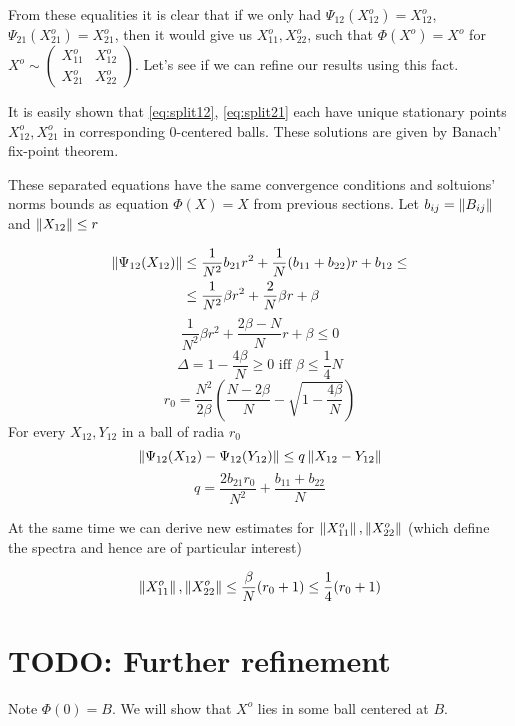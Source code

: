 \documentclass{article}
\begin{document}
From these equalities it is clear that if we only had
\( {\Psi_{12}(X_{12}^o) = X_{12}^o} \),
\( {\Psi_{21}(X_{21}^o) = X_{21}^o} \),
then it would give us \( X_{11}^o, X_{22}^o \), such that
\( \Phi(X^o) = X^o \) for
\( X^o \sim
\left(\begin{smallmatrix}
    X_{11}^o & X_{12}^o \\
    X_{21}^o & X_{22}^o
\end{smallmatrix}\right) \).
Let's see if we can refine our results using this fact.

It is easily shown
that \eqref{eq:split12}, \eqref{eq:split21}
each have unique stationary points \( X_{12}^o, X_{21}^o \)
in corresponding \( 0 \)-centered balls.
These solutions are given by Banach' fix-point theorem.

These separated equations have the same convergence conditions
and soltuions' norms bounds as equation \( \Phi(X)=X \) from previous sections.
Let \( b_{ij} = \left\|{B_{ij}}\right\| \)
and \( \left\|{X_{12}}\right\| \leq r \)

\[\begin{aligned}
    \left\|{\Psi_{12}(X_{12})}\right\|
    & \leq \frac1{N^2} b_{21}r^2 + \frac1N (b_{11}+b_{22}) r + b_{12} \leq \\
    & \leq \frac{1}{N^2}\beta r^2 + \frac2N \beta r + \beta
\end{aligned}\]
\[ \frac{1}{N^2}\beta r^2 + \frac{2\beta - N}{N} r + \beta \leq 0 \]
\[
    \Delta = 1 - \frac{4\beta}{N} \geq 0
    \text{ iff }
    \beta \leq \frac14 N
\]
\[
    r_0 = \frac{N^2}{2\beta}
          \left(
                \frac{N-2\beta}{N} - \sqrt{1 - \frac{4\beta}{N}}
          \right)
    \]
For every \( X_{12}, Y_{12} \) in a ball of radia \( r_0 \)
\[ \left\|{\Psi_{12}(X_{12}) - \Psi_{12}(Y_{12})}\right\| \leq q \left\|{X_{12}-Y_{12}}\right\| \]
\begin{equation}\label{eq:convergencespeed}
    q = \frac{2 b_{21} r_0}{N^2} + \frac{b_{11}+b_{22}}{N}
\end{equation}

At the same time we can derive new estimates for
\( \left\|{X_{11}^o}\right\|, \left\|{X_{22}^o}\right\| \)
(which define the spectra and hence are of particular interest)

\[ \left\|{X_{11}^o}\right\|, \left\|{X_{22}^o}\right\|
   \leq \frac{\beta}{N}(r_0 + 1)
   \leq \frac14 (r_0 + 1)\]

\section{TODO: Further refinement}
Note \( \Phi(0) = B \).
We will show that \( X^o \) lies in some ball centered at \( B \).
\end{document}
